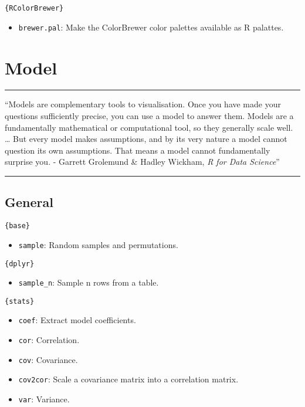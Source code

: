 \documentclass[]{book}
\providecommand{\tightlist}{%
  \setlength{\itemsep}{0pt}\setlength{\parskip}{0pt}}
\begin{document}
\texttt{\{RColorBrewer\}}

\begin{itemize}
\tightlist
\item
  \texttt{brewer.pal}: Make the ColorBrewer color palettes available as R palattes.
\end{itemize}

\hypertarget{model}{%
\chapter{Model}\label{model}}

\begin{center}\rule{0.5\linewidth}{\linethickness}\end{center}

``Models are complementary tools to visualisation. Once you have made your questions sufficiently precise, you can use a model to answer them. Models are a fundamentally mathematical or computational tool, so they generally scale well. \ldots{} But every model makes assumptions, and by its very nature a model cannot question its own assumptions. That means a model cannot fundamentally surprise you.
- Garrett Grolemund \& Hadley Wickham, \emph{R for Data Science}''

\begin{center}\rule{0.5\linewidth}{\linethickness}\end{center}

\hypertarget{general}{%
\section{General}\label{general}}

\texttt{\{base\}}

\begin{itemize}
\tightlist
\item
  \texttt{sample}: Random samples and permutations.
\end{itemize}

\texttt{\{dplyr\}}

\begin{itemize}
\tightlist
\item
  \texttt{sample\_n}: Sample n rows from a table.
\end{itemize}

\texttt{\{stats\}}

\begin{itemize}
\tightlist
\item
  \texttt{coef}: Extract model coefficients.
\item
  \texttt{cor}: Correlation.
\item
  \texttt{cov}: Covariance.
\item
  \texttt{cov2cor}: Scale a covariance matrix into a correlation matrix.
\item
  \texttt{var}: Variance.
\end{itemize}
\end{document}
